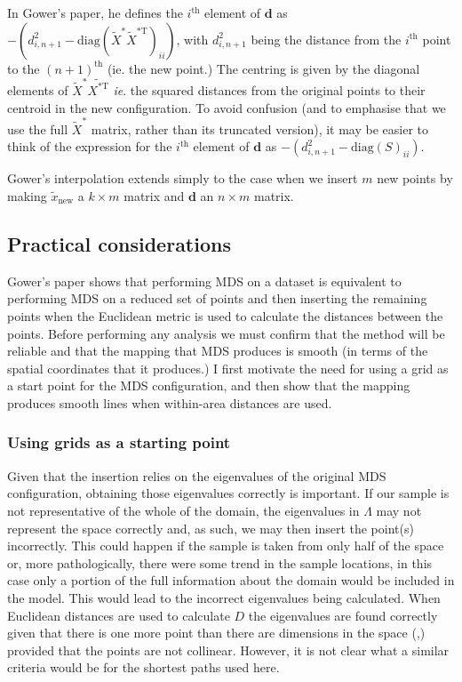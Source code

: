 \documentclass[a4paper,10pt]{article}
\newcommand{\cross}{\times}
\begin{document}
In Gower's paper, he defines the $i^\text{th}$ element of $\mathbf{d}$ as $-(d^2_{i,n+1}-\text{diag}(\tilde{X}^* \tilde{X}^{*\text{T}})_{ii})$, with $d^2_{i,n+1}$ being the distance from the $i^\text{th}$ point to the $(n+1)^\text{th}$ (ie. the new point.) The centring is given by the diagonal elements of $\tilde{X}^*\tilde{X^{* \text{T}}}$ \emph{ie}. the squared distances from the original points to their centroid in the new configuration. To avoid confusion (and to emphasise that we use the full $\tilde{X}^*$ matrix, rather than its truncated version), it may be easier to think of the expression for the $i^\text{th}$ element of $\mathbf{d}$ as $-(d^2_{i,n+1}-\text{diag}(S)_{ii})$.

Gower's interpolation extends simply to the case when we insert $m$ new points by making $\tilde{x}_{\text{new}}$ a $k \cross m$ matrix and $\mathbf{d}$ an $n \cross m$ matrix.


\subsection{Practical considerations}

Gower's paper shows that performing MDS on a dataset is equivalent to performing MDS on a reduced set of points and then inserting the remaining points when the Euclidean metric is used to calculate the distances between the points. Before performing any analysis we must confirm that the method will be reliable and that the mapping that MDS produces is smooth (in terms of the spatial coordinates that it produces.) I first motivate the need for using a grid as a start point for the MDS configuration, and then show that the mapping produces smooth lines when within-area distances are used.

\subsubsection{Using grids as a starting point}

Given that the insertion relies on the eigenvalues of the original MDS configuration, obtaining those eigenvalues correctly is important. If our sample is not representative of the whole of the domain, the eigenvalues in $\Lambda$ may not represent the space correctly and, as such, we may then insert the point(s) incorrectly. This could happen if the sample is taken from only half of the space or, more pathologically, there were some trend in the sample locations, in this case only a portion of the full information about the domain would be included in the model. This would lead to the incorrect eigenvalues being calculated. When Euclidean distances are used to calculate $D$ the eigenvalues are found correctly given that there is one more point than there are dimensions in the space (\cite{landmark},) provided that the points are not collinear. However, it is not clear what a similar criteria would be for the shortest paths used here. 
\end{document}
